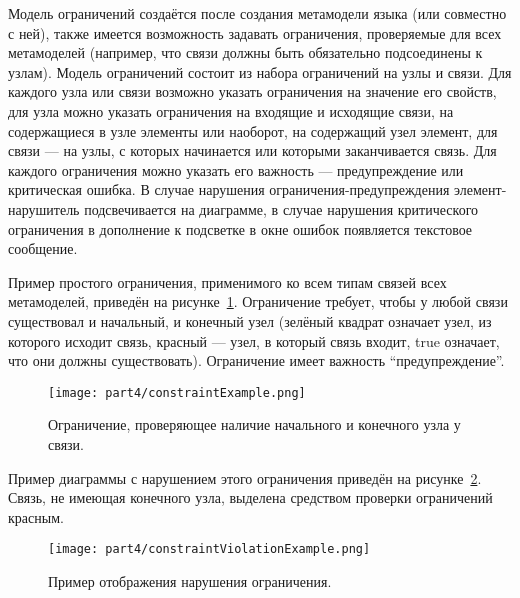 Модель ограничений создаётся после создания метамодели языка (или совместно с ней), 
также имеется возможность задавать ограничения, проверяемые для всех метамоделей (например, 
что связи должны быть обязательно подсоединены к узлам). Модель ограничений состоит 
из набора ограничений на узлы и связи. Для каждого узла или связи возможно указать 
ограничения на значение его свойств, для узла можно указать ограничения на входящие 
и исходящие связи, на содержащиеся в узле элементы или наоборот, на содержащий узел 
элемент, для связи --- на узлы, с которых начинается или которыми заканчивается связь. 
Для каждого ограничения можно указать его важность --- предупреждение или критическая 
ошибка. В случае нарушения ограничения-предупреждения элемент-нарушитель подсвечивается 
на диаграмме, в случае нарушения критического ограничения в дополнение к подсветке в 
окне ошибок появляется текстовое сообщение. 

Пример простого ограничения, применимого ко всем типам связей всех метамоделей, приведён 
на рисунке~\ref{image:constraintExample}. Ограничение требует, чтобы у любой связи существовал и начальный, и конечный 
узел (зелёный квадрат означает узел, из которого исходит связь, красный --- узел, в 
который связь входит, true означает, что они должны существовать). Ограничение имеет 
важность "`предупреждение"'.

\begin{figure} [ht]
	\begin{center}
		\texttt{[image: part4/constraintExample.png]}
		\caption{Ограничение, проверяющее наличие начального и конечного узла у связи.}
		\label{image:constraintExample}
	\end{center}
\end{figure}

Пример диаграммы с нарушением этого ограничения приведён на рисунке~\ref{image:constraintViolationExample}. 
Связь, не имеющая конечного узла, выделена средством проверки ограничений красным.

\begin{figure} [ht]
	\begin{center}
		\texttt{[image: part4/constraintViolationExample.png]}
		\caption{Пример отображения нарушения ограничения.}
		\label{image:constraintViolationExample}
	\end{center}
\end{figure}

